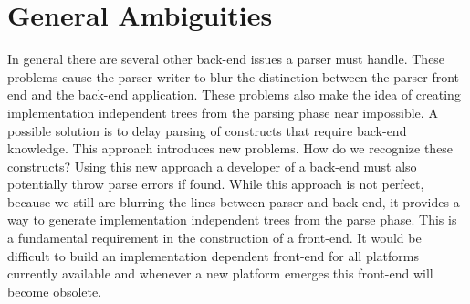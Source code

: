 \section{General Ambiguities}
In general there are several other back-end issues a parser must handle.  
These problems cause the parser writer to blur the distinction between the parser front-end
and the back-end application.  These problems also make the idea of creating implementation 
independent trees from the parsing phase near impossible.  A possible solution is to delay parsing of constructs that require back-end knowledge.  This approach introduces new problems.  How do we recognize these constructs?  Using this new approach a developer of a back-end must also potentially throw parse errors if found.  While this approach is not perfect, because we still are blurring the lines between parser and back-end, it provides a way to generate implementation independent trees from the parse phase.  This is a fundamental requirement in the construction of a front-end.  It would be difficult to build an implementation dependent front-end for all platforms currently available and whenever a new platform emerges this front-end will become obsolete.
